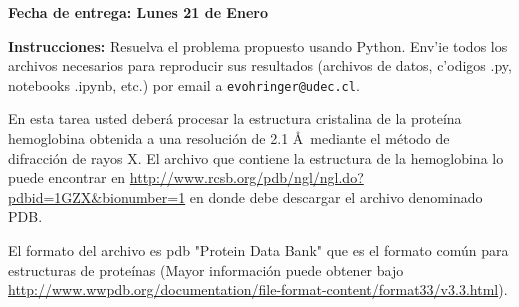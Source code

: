 \documentclass[11pt]{exam}
\begin{document}
\firstpageheadrule
\runningheadrule
{}
\cfoot{ }
\begin{flushleft}
\vspace{0.2in}
\vspace{0.25cm}
\end{flushleft}

\begin{center}
\textbf{Fecha de entrega: Lunes 21 de Enero}
\end{center}
\textbf{Instrucciones:} Resuelva el problema propuesto usando Python. Env'ie todos los archivos necesarios para reproducir sus resultados (archivos de datos, c'odigos .py, notebooks .ipynb, etc.) por email a \texttt{evohringer@udec.cl}.

\bigskip

En esta tarea usted deber\'a procesar la estructura cristalina de la prote\'ina hemoglobina obtenida a una resoluci\'on de 2.1 \AA\ mediante el m\'etodo de difracci\'on de rayos X. El archivo que contiene la estructura de la hemoglobina lo puede encontrar en \url{http://www.rcsb.org/pdb/ngl/ngl.do?pdbid=1GZX&bionumber=1} en donde debe descargar el archivo denominado PDB.

El formato del archivo es pdb "Protein Data Bank" que es el formato com\'un para estructuras de prote\'inas (Mayor informaci\'on puede obtener bajo \url{http://www.wwpdb.org/documentation/file-format-content/format33/v3.3.html}). 
\end{document}
